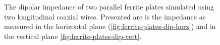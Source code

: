 \begin{figure}
\caption{The dipolar impedance of two parallel ferrite plates simulated using two longitudinal coaxial wires. Presented are is the impedance as measured in the horizontal plane (\ref{fig:ferrite-plates-dip-horz}) and in the vertical plane \ref{fig:ferrite-plates-dip-vert}.}
\label{fig:ferrite-plates-dipolar}
\end{figure}

